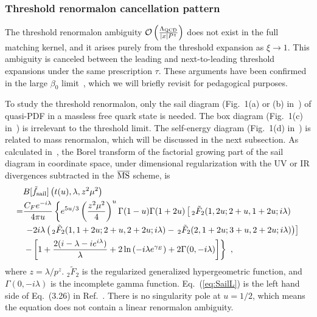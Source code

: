 \documentclass[a4paper,11pt]{article}
\begin{document}
\subsubsection{Threshold renormalon cancellation pattern}
The threshold renormalon ambiguity $\mathcal{O}\left(\frac{\Lambda_{\rm QCD}}{|x| P^z}\right)$ does not exist in the full matching kernel, and it arises purely from the threshold expansion as $\xi \rightarrow 1$. This ambiguity is canceled between the leading and next-to-leading threshold expansions under the same prescription $\tau$. These arguments have been confirmed in the large $\beta_0$ limit~\cite{Liu:2023onm}, which we will briefly revisit for pedagogical purposes.

To study the threshold renormalon, only the sail diagram (Fig.~1(a) or (b) in~\cite{Braun:2018brg}) of quasi-PDF in a massless free quark state is needed. The box diagram (Fig.~1(c) in~\cite{Braun:2018brg}) is irrelevant to the threshold limit. The self-energy diagram (Fig.~1(d) in~\cite{Braun:2018brg}) is related to mass renormalon, which will be discussed in the next subsection. As calculated in~\cite{Braun:2018brg,Liu:2023onm}, the Borel transform of the factorial growing part of the sail diagram in coordinate space, under dimensional regularization with the UV or IR divergences subtracted in the $\overline{\rm MS}$ scheme, is
\begin{align}\label{eq:SailL}
&B[\tilde f_{\rm sail}]\left(t(u),\lambda, z^2\mu^2\right) \nonumber\\
=& \frac{C_F e^{-i \lambda }}{4 \pi u} \left\{ e^{5u/3} \left(\frac{z^2 \mu ^2}{4}\right)^u \Gamma(1-u) \Gamma(1+2 u) 
\left[ \, _2\tilde{F}_2(1,2 u;2+u,1+2 u;i \lambda ) \right. \right. \nonumber\\
&\left. \left. -2 i \lambda  \left(\, _2\tilde{F}_2(1,1+2 u;2+u,2+2u;i \lambda )-\, _2\tilde{F}_2(2,1+2 u;3+u,2+2 u;i \lambda )\right) \right]  \right. \nonumber\\
&\left.-\left[ 1 + \frac{2 (i-\lambda -i e^{i \lambda})}{\lambda} +   2 \ln\left(-i \lambda e^{\gamma_E} \right) + 2 \Gamma(0,-i \lambda) \right] \right\} \ ,
\end{align}
where $z=\lambda/p^z$. $_2\tilde{F}_2$ is the regularized generalized hypergeometric function, and $\Gamma(0,-i \lambda)$ is the incomplete gamma function. Eq.~(\ref{eq:SailL}) is the left hand side of Eq.~(3.26) in Ref.~\cite{Liu:2023onm}. There is no singularity pole at $u = 1/2$, which means the equation does not contain a linear renormalon ambiguity. 
\end{document}
